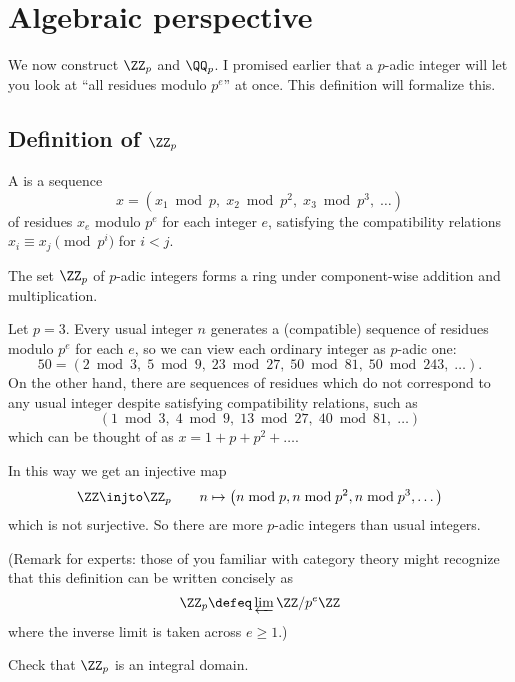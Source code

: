\section{Algebraic perspective}
We now construct $\ZZ_p$ and $\QQ_p$.
I promised earlier that a $p$-adic integer will let you look at
``all residues modulo $p^e$'' at once.
This definition will formalize this.

\subsection{Definition of $\ZZ_p$}
\begin{definition}
	[Introducing $\ZZ_p$]
	A  is a sequence
	\[ x = (x_1 \bmod p, \; x_2 \bmod{p^2}, \; x_3 \bmod{p^3}, \; \dots) \]
	of residues $x_e$ modulo $p^e$ for each integer $e$,
	satisfying the compatibility relations
	$x_i \equiv x_j \pmod{p^i}$ for $i < j$.

	The set $\ZZ_p$ of $p$-adic integers forms a ring
	under component-wise addition and multiplication.
\end{definition}

\begin{example}
	Let $p=3$.
	Every usual integer $n$ generates
	a (compatible) sequence of residues modulo $p^e$ for each $e$,
	so we can view each ordinary integer as $p$-adic one:
	\[ 50 = \left( 2 \bmod 3, \; 5 \bmod 9, \;
		23 \bmod{27}, \; 50 \bmod{81}, \; 50 \bmod{243}, \; \dots \right). \]
	On the other hand, there are sequences of residues
	which do not correspond to any usual integer despite
	satisfying compatibility relations, such as
	\[ \left( 1 \bmod 3, \; 4 \bmod 9, \;
		13 \bmod{27}, \; 40 \bmod{81}, \; \dots \right) \]
	which can be thought of as $x = 1 + p + p^2 + \dots$.
\end{example}
In this way we get an injective map
\[ \ZZ \injto \ZZ_p \qquad
	n \mapsto \left( n \bmod p, n \bmod{p^2}, n \bmod{p^3}, \dots \right) \]
which is not surjective.
So there are more $p$-adic integers than usual integers.

(Remark for experts:
those of you familiar with category theory might recognize
that this definition can be written concisely as
\[ \ZZ_p \defeq \varprojlim \ZZ/p^e \ZZ \]
where the inverse limit is taken across $e \ge 1$.)

\begin{exercise}
	Check that $\ZZ_p$ is an integral domain.
\end{exercise}


